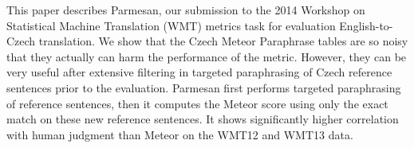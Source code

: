 This paper describes Parmesan, our submission to the 2014 Workshop on Statistical Machine Translation (WMT) metrics task for evaluation English-to-Czech translation. We show that the Czech Meteor Paraphrase tables are so noisy that they actually can harm the performance of the metric. However, they can be very useful after extensive filtering in targeted paraphrasing of Czech reference sentences prior to the evaluation. Parmesan first performs targeted paraphrasing of reference sentences, then it computes the Meteor score using only the exact match on these new reference sentences. It shows significantly higher correlation with human judgment than Meteor on the WMT12 and WMT13 data.

